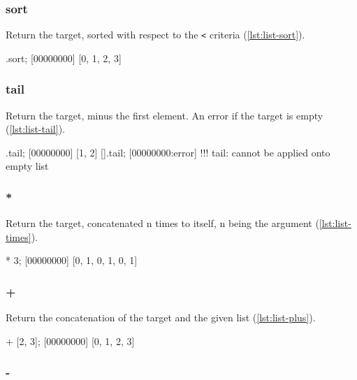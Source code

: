 \subsubsection{sort}

Return the target, sorted with respect to the \lstinline|<| criteria
(\autoref{lst:list-sort}).

\begin{urbiscript}[caption=List.sort, label=lst:list-sort, float=\floatposh]
  [1, 0, 3, 2].sort;
  [00000000] [0, 1, 2, 3]
\end{urbiscript}

\subsubsection{tail}

Return the target, minus the first element. An error if the target is
empty (\autoref{lst:list-tail}).

\begin{urbiscript}[caption=List.tail, label=lst:list-tail, float=\floatposh]
  [0, 1, 2].tail;
  [00000000] [1, 2]
  [].tail;
  [00000000:error] !!! tail: cannot be applied onto empty list
\end{urbiscript}

\subsubsection{*}

Return the target, concatenated n times to itself, n being the
argument (\autoref{lst:list-times}).

\begin{urbiscript}[caption=List.'*', label=lst:list-times,
  float=\floatposh]
  [0, 1] * 3;
  [00000000] [0, 1, 0, 1, 0, 1]
\end{urbiscript}

\subsubsection{+}

Return the concatenation of the target and the given list
(\autoref{lst:list-plus}).

\begin{urbiscript}[caption=List.'+', label=lst:list-plus,
  float=\floatpos]
  [0, 1] + [2, 3];
  [00000000] [0, 1, 2, 3]
\end{urbiscript}

\subsubsection{-}


